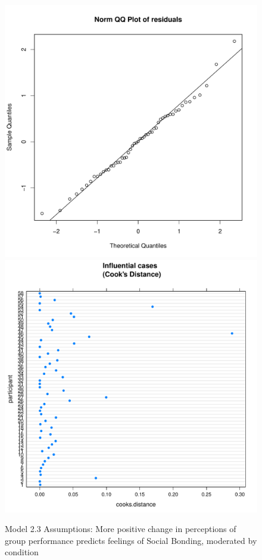 \begin{figure}[htbp]
    \includegraphics[scale =.4]{images/TEM23QQNorm.pdf}
    \includegraphics[scale =.4]{images/TEM23CooksD.pdf}
    \caption{Model 2.3 Assumptions: More positive change in perceptions of group performance predicts feelings of Social Bonding, moderated by condition}
    \label{fig:M23Assumptions}
\end{figure}
